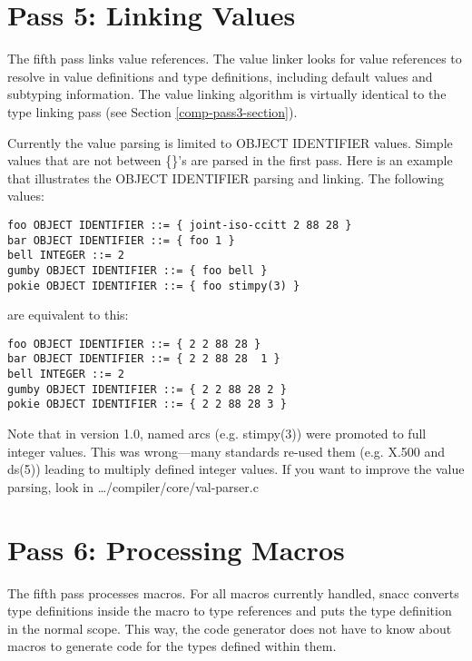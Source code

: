 \section{\label{comp-pass5-section}Pass 5: Linking Values}
The fifth pass links value references. The value linker looks for
value references to resolve in value definitions and type definitions,
including default values and subtyping information.  The value linking
algorithm is virtually identical to the type linking pass (see Section
\ref{comp-pass3-section}).

Currently the value parsing is limited to OBJECT IDENTIFIER values.
Simple values that are not between \{\}'s are parsed in the first
pass.  Here is an example that illustrates the OBJECT IDENTIFIER
parsing and linking.  The following values:

\begin{small}
\begin{verbatim}
foo OBJECT IDENTIFIER ::= { joint-iso-ccitt 2 88 28 }
bar OBJECT IDENTIFIER ::= { foo 1 }
bell INTEGER ::= 2
gumby OBJECT IDENTIFIER ::= { foo bell }
pokie OBJECT IDENTIFIER ::= { foo stimpy(3) }
\end{verbatim}
\end{small}

\noindent
are equivalent to this:

\begin{small}
\begin{verbatim}
foo OBJECT IDENTIFIER ::= { 2 2 88 28 }
bar OBJECT IDENTIFIER ::= { 2 2 88 28  1 }
bell INTEGER ::= 2
gumby OBJECT IDENTIFIER ::= { 2 2 88 28 2 }
pokie OBJECT IDENTIFIER ::= { 2 2 88 28 3 }
\end{verbatim}
\end{small}

Note that in version 1.0, named arcs (e.g. {\ASN stimpy(3)}) were
promoted to full integer values.  This was wrong---many standards
re-used them (e.g. X.500 and {\ASN ds(5)}) leading to multiply defined
integer values.  If you want to improve the value parsing, look in
{\ufn \dots/compiler/core/val-parser.c}

\section{\label{comp-pass6-section}Pass 6: Processing Macros}

The fifth pass processes macros.  For all macros currently handled,
snacc converts type definitions inside the macro to type references
and puts the type definition in the normal scope.  This way, the code
generator does not have to know about macros to generate code for the
types defined within them.

